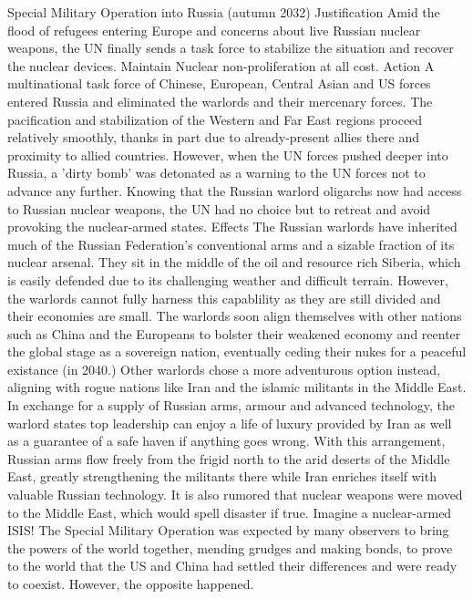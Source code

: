     Special Military Operation into Russia (autumn 2032)
        Justification
            Amid the flood of refugees entering Europe and concerns about live Russian nuclear weapons, the UN finally sends a task force to stabilize the situation and recover the nuclear devices.
            Maintain Nuclear non-proliferation at all cost.
        Action
            A multinational task force of Chinese, European, Central Asian and US forces entered Russia and eliminated the warlords and their mercenary forces. The pacification and stabilization of the Western and Far East regions proceed relatively smoothly, thanks in part due to already-present allies there and proximity to allied countries.
            However, when the UN forces pushed deeper into Russia, a 'dirty bomb' was detonated as a warning to the UN forces not to advance any further. Knowing that the Russian warlord oligarchs now had access to Russian nuclear weapons, the UN had no choice but to retreat and avoid provoking the nuclear-armed states.
        Effects
            The Russian warlords have inherited much of the Russian Federation's conventional arms and a sizable fraction of its nuclear arsenal. They sit in the middle of the oil and resource rich Siberia, which is easily defended due to its challenging weather and difficult terrain. However, the warlords cannot fully harness this capablility as they are still divided and their economies are small.
            The warlords soon align themselves with other nations such as China and the Europeans to bolster their weakened economy and reenter the global stage as a sovereign nation, eventually ceding their nukes for a peaceful existance (in 2040.)
            Other warlords chose a more adventurous option instead, aligning with rogue nations like Iran and the islamic militants in the Middle East. In exchange for a supply of Russian arms, armour and advanced technology, the warlord states top leadership can enjoy a life of luxury provided by Iran as well as a guarantee of a safe haven if anything goes wrong.
            With this arrangement, Russian arms flow freely from the frigid north to the arid deserts of the Middle East, greatly strengthening the militants there while Iran enriches itself with valuable Russian technology. It is also rumored that nuclear weapons were moved to the Middle East, which would spell disaster if true. Imagine a nuclear-armed ISIS!
            The Special Military Operation was expected by many observers to bring the powers of the world together, mending grudges and making bonds, to prove to the world that the US and China had settled their differences and were ready to coexist. However, the opposite happened.
